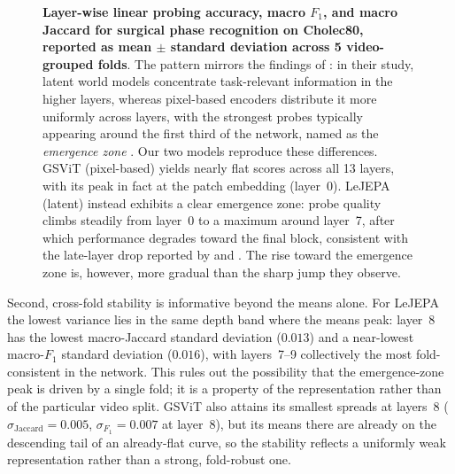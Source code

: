 \documentclass[11pt, a4paper]{article}
\begin{document}
\begin{figure}[t!]
\centering
\begin{minipage}{.49\textwidth}
\centering

\end{minipage}\hfill
\begin{minipage}{.49\textwidth}
\centering

\end{minipage}
\caption{\textbf{Layer-wise linear probing accuracy, macro $F_1$, and macro
    Jaccard for surgical phase recognition on Cholec80, reported as mean
    $\pm$ standard deviation across 5 video-grouped folds}. The pattern
    mirrors the findings of \textcite{joseph-2026}: in their study,
    latent world models concentrate task-relevant information in the
    higher layers, whereas pixel-based encoders distribute it more
    uniformly across layers, with the strongest probes typically
    appearing around the first third of the network, named as the
    \emph{emergence zone} \parencite{joseph-2026}. Our two models reproduce these differences.
    GSViT (pixel-based) yields nearly flat scores across all 13 layers, with its peak
    in fact at the patch embedding (layer~0). LeJEPA (latent) instead
    exhibits a clear emergence zone: probe quality climbs steadily from
    layer~0 to a maximum around layer~7, after
    which performance degrades toward the final block, consistent with the late-layer drop reported by \textcite{joseph-2026} and \textcite{bolya-2025}. The rise toward
    the emergence zone is, however, more gradual than the sharp jump
    they observe.}
    \label{fig:probe_layerwise}
\end{figure}

Second, cross-fold stability is informative beyond the means alone. For
LeJEPA the lowest variance lies in the same depth band where the means
peak: layer~8 has the lowest macro-Jaccard standard deviation ($0.013$)
and a near-lowest macro-$F_1$ standard deviation ($0.016$), with
layers~7--9 collectively the most fold-consistent in the network. This
rules out the possibility that the emergence-zone peak is driven by a
single fold; it is a property of the representation rather than of the
particular video split. GSViT also attains its smallest spreads at
layers~8 ($\sigma_{\text{Jaccard}} = 0.005$, $\sigma_{F_1} = 0.007$ at
layer~8), but its means there are already on the descending tail of an
already-flat curve, so the stability reflects a uniformly weak
representation rather than a strong, fold-robust one.
\end{document}
